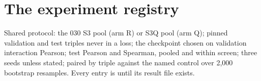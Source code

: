 
\clearpage
\section{The experiment registry}
\label{sec:registry}

Shared protocol: the 030 S3 pool (arm R) or S3Q pool (arm Q); pinned validation and test
triples never in a loss; the checkpoint chosen on validation interaction Pearson; test
Pearson and Spearman, pooled and within screen; three seeds unless stated; paired by triple
against the named control over 2,000 bootstrap resamples. Every entry is 
until its result file exists.

